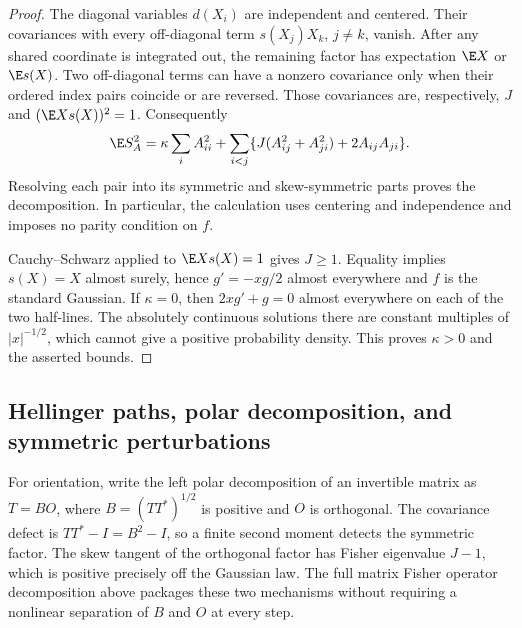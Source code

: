 \begin{proof}
The diagonal variables $d(X_i)$ are independent and centered.
Their covariances with every off-diagonal term $s(X_j)X_k$, $j\ne k$,
vanish.
After any shared coordinate is integrated out, the remaining factor has
expectation \(\E X\) or \(\E s(X)\).
Two off-diagonal terms can have a nonzero covariance only when their
ordered index pairs coincide or are reversed.  Those covariances are,
respectively, $J$ and $(\E Xs(X))^2=1$.  Consequently
\begin{equation}
 \E S_A^2
 =\kappa\sum_i A_{ii}^2+
   \sum_{i<j}\{J(A_{ij}^2+A_{ji}^2)+2A_{ij}A_{ji}\}.
 \label{eq:fisher-pair-form}
\end{equation}
Resolving each pair into its symmetric and skew-symmetric parts proves
the decomposition.  In particular, the calculation uses centering and
independence and imposes no parity condition on $f$.

Cauchy--Schwarz applied to $\E Xs(X)=1$ gives $J\ge1$.
Equality implies $s(X)=X$ almost surely, hence
$g'=-xg/2$ almost everywhere and $f$ is the standard Gaussian.
If $\kappa=0$, then $2xg'+g=0$ almost everywhere on each of the two
half-lines.  The absolutely continuous solutions there are constant
multiples of $|x|^{-1/2}$, which cannot give a positive probability
density.  This proves $\kappa>0$ and the asserted bounds.
\end{proof}

\subsection{Hellinger paths, polar decomposition, and symmetric perturbations}
\label{sec:hellinger-paths}

For orientation, write the left polar decomposition of an invertible matrix
as \(T=BO\), where \(B=(TT^*)^{1/2}\) is positive and \(O\) is
orthogonal.  The covariance defect is \(TT^*-I=B^2-I\), so a
finite second moment detects the symmetric factor.  The skew tangent of the
orthogonal factor has Fisher eigenvalue \(J-1\), which is positive precisely
off the Gaussian law.  The full matrix Fisher operator decomposition above packages
these two mechanisms without requiring a nonlinear separation of \(B\) and
\(O\) at every step.

